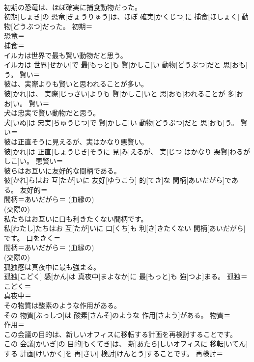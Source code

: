 \documentclass[8pt]{extreport}
\begin{document}
\begin{CJK}{UTF8}{min}
\\	初期の恐竜は、ほぼ確実に捕食動物だった。	
\\	初期[しょき]の 恐竜[きょうりゅう]は、ほぼ 確実[かくじつ]に 捕食[ほしょく] 動物[どうぶつ]だった。	初期＝ 
\\	恐竜＝ 
\\	捕食＝ 
\\	イルカは世界で最も賢い動物だと思う。	
\\	イルカは 世界[せかい]で 最[もっと]も 賢[かしこ]い 動物[どうぶつ]だと 思[おも]う。	賢い＝ 
\\	彼は、実際よりも賢いと思われることが多い。	
\\	彼[かれ]は、 実際[じっさい]よりも 賢[かしこ]いと 思[おも]われることが 多[おお]い。	賢い＝ 
\\	犬は忠実で賢い動物だと思う。	
\\	犬[いぬ]は 忠実[ちゅうじつ]で 賢[かしこ]い 動物[どうぶつ]だと 思[おも]う。	賢い＝ 
\\	彼は正直そうに見えるが、実はかなり悪賢い。	
\\	彼[かれ]は 正直[しょうじき]そうに 見[み]えるが、 実[じつ]はかなり 悪賢[わるがしこ]い。	悪賢い＝ 
\\	彼らはお互いに友好的な間柄である。	
\\	彼[かれ]らはお 互[たが]いに 友好[ゆうこう] 的[てき]な 間柄[あいだがら]である。	友好的＝ 
\\	間柄＝あいだがら＝ (血縁の) 
\\	(交際の) 
\\	私たちはお互いに口も利きたくない間柄です。	
\\	私[わたし]たちはお 互[たが]いに 口[くち]も 利[き]きたくない 間柄[あいだがら]です。	口をきく＝ 
\\	間柄＝あいだがら＝ (血縁の) 
\\	(交際の) 
\\	孤独感は真夜中に最も強まる。	
\\	孤独[こどく] 感[かん]は 真夜中[まよなか]に 最[もっと]も 強[つよ]まる。	孤独＝こどく＝ 
\\	真夜中＝ 
\\	その物質は酸素のような作用がある。	
\\	その 物質[ぶっしつ]は 酸素[さんそ]のような 作用[さよう]がある。	物質＝ 
\\	作用＝ 
\\	この会議の目的は、新しいオフィスに移転する計画を再検討することです。	
\\	この 会議[かいぎ]の 目的[もくてき]は、 新[あたら]しいオフィスに 移転[いてん]する 計画[けいかく]を 再[さい] 検討[けんとう]することです。	再検討＝ 

\end{CJK}
\end{document}

